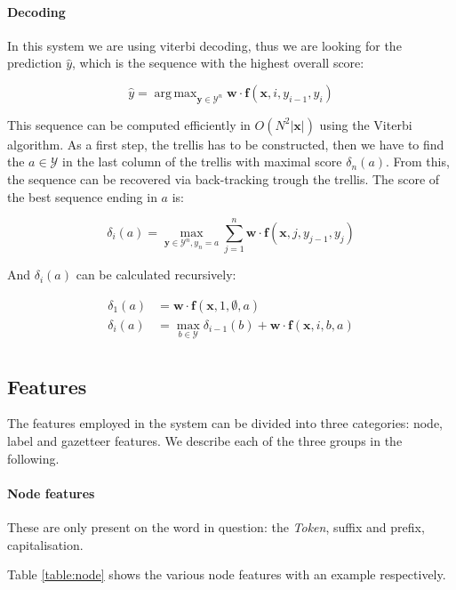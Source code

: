 \documentclass[11pt]{article}
\DeclareMathOperator*{\argmax}{arg\,max}
\begin{document}
\paragraph*{Decoding}
In this system we are using viterbi decoding, thus we are looking for the prediction $\hat{y}$, which is the sequence with the highest overall score:

\[
\hat{y} = \argmax_{\mathbf{y} \in \mathcal{Y}^{n}} \mathbf{w} \cdot \boldsymbol{f}(\mathbf{x}, i, y_{i-1}, y_{i})
\]

This sequence can be computed efficiently in $ O( N^2 |\mathbf{x}| ) $ using the Viterbi algorithm. 
As a first step, the trellis has to be constructed, then we have to find the $ a \in \mathcal{Y}$ in the 
last column of the trellis with maximal score $\delta_n(a)$. From this, the sequence can be recovered via back-tracking trough the trellis. 
The score of the best sequence ending in $a$ is:

\[
\delta_i(a) = \max_{\mathbf{y} \in \mathcal{Y}^{n}, y_n = a} \sum_{j=1}^{n}{\mathbf{w} \cdot \boldsymbol{f}(\mathbf{x}, j, y_{j-1}, y_{j})}
\]

\noindent And $\delta_i(a)$ can be calculated recursively:

\begin{align*}
\delta_1(a) &= \mathbf{w} \cdot \boldsymbol{f}(\mathbf{x}, 1, \emptyset, a) \\
\delta_i(a) &= \max_{b \in \mathcal{Y}} \delta_{i-1}(b) + \mathbf{w} \cdot \boldsymbol{f}(\mathbf{x}, i, b, a) \\
\end{align*}


\subsection*{Features}
The features employed in the system can be divided into three categories: node, label and gazetteer features. 
We describe each of the three groups in the following.

\paragraph*{Node features}
These are only present on the word in question: the \emph{Token}, suffix and prefix, capitalisation.

Table \ref{table:node} shows the various node features with an example respectively.
\end{document}
